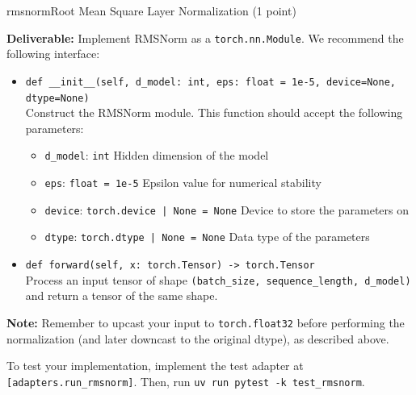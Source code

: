 \begin{problembox}{rmsnorm}{Root Mean Square Layer Normalization (1 point)}

    \textbf{Deliverable:} Implement RMSNorm as a \texttt{torch.nn.Module}. We recommend the following interface:

    \begin{itemize}[label={}, leftmargin=0pt, itemsep=1em, parsep=0pt]

        \item \texttt{def __init__(self, d_model: int, eps: float = 1e-5, device=None, dtype=None)} \\
              Construct the RMSNorm module. This function should accept the following parameters:

              \begin{itemize}[label={}, leftmargin=1.5em, itemsep=0.5em, parsep=0pt, topsep=0.5em]
                  \item \texttt{d\_model}: \textcolor{green!50!black}{\texttt{int}} Hidden dimension of the model
                  \item \texttt{eps}: \textcolor{green!50!black}{\texttt{float = 1e-5}} Epsilon value for numerical stability
                  \item \texttt{device}: \textcolor{green!50!black}{\texttt{torch.device | None = None}} Device to store the parameters on
                  \item \texttt{dtype}: \textcolor{green!50!black}{\texttt{torch.dtype | None = None}} Data type of the parameters
              \end{itemize}

        \item \texttt{def forward(self, x: torch.Tensor) -> torch.Tensor} \\
              Process an input tensor of shape \texttt{(batch\_size, sequence\_length, d\_model)} and return a tensor of the same shape.

    \end{itemize}

    \vspace{0.5em}
    \textbf{Note:} Remember to upcast your input to \texttt{torch.float32} before performing the normalization (and later downcast to the original dtype), as described above.

    To test your implementation, implement the test adapter at \textcolor{red!80!black}{\texttt{[adapters.run\_rmsnorm]}}. Then, run \texttt{uv run pytest -k test\_rmsnorm}.

\end{problembox}

